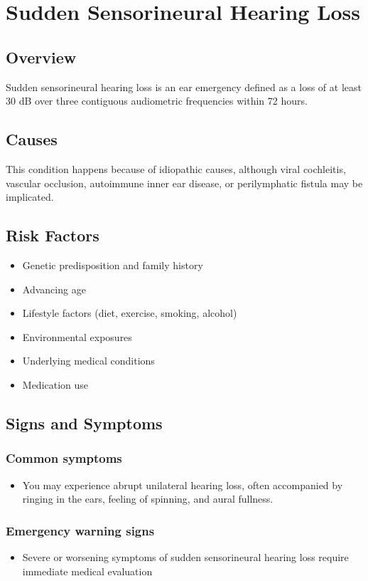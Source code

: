 \chapter{Sudden Sensorineural Hearing Loss}
\label{sec:Sudden Sensorineural Hearing Loss}

\section{Overview}
Sudden sensorineural hearing loss is an ear emergency defined as a loss of at least 30 dB over three contiguous audiometric frequencies within 72 hours.
\section{Causes}
This condition happens because of idiopathic causes, although viral cochleitis, vascular occlusion, autoimmune inner ear disease, or perilymphatic fistula may be implicated.     
\section{Risk Factors}

\begin{itemize}[noitemsep]
  \item Genetic predisposition and family history
  \item Advancing age
  \item Lifestyle factors (diet, exercise, smoking, alcohol)
  \item Environmental exposures
  \item Underlying medical conditions
  \item Medication use
\end{itemize}
\section{Signs and Symptoms}

\subsection{Common symptoms}
\begin{itemize}[noitemsep]
  \item You may experience abrupt unilateral hearing loss, often accompanied by ringing in the ears, feeling of spinning, and aural fullness. 
  \end{itemize}

\subsection{Emergency warning signs}
\begin{itemize}[noitemsep]
  \item Severe or worsening symptoms of sudden sensorineural hearing loss require immediate medical evaluation
\end{itemize}

